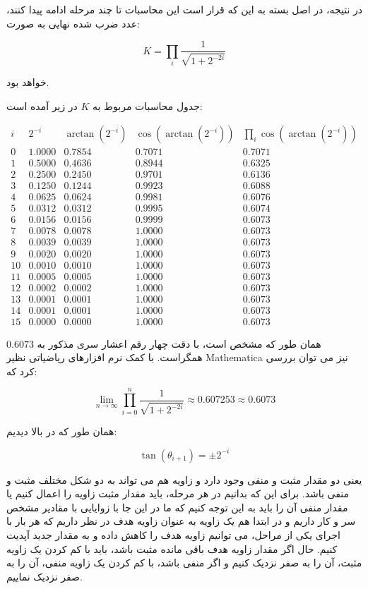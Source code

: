 \documentclass[12pt,titlepage,a4page , tikz , multi,table , svgnames,xcdraw]{article}
\begin{document}
در نتیجه، در اصل بسته به این که قرار است این محاسبات تا چند مرحله ادامه پیدا کنند، عدد ضرب شده نهایی به صورت:

$$K = \prod_{i} \frac{1}{\sqrt{1 + 2^{-2i}}}$$

خواهد بود.


جدول محاسبات مربوط به $K$ در زیر آمده است:

$$\begin{array}{c|c|c|c|c}
{i} & {2^{-i}} & {\arctan(2^{-i})} & {\cos(\arctan(2^{-i}))} & \prod_{i} \cos(\arctan(2^{-i})) \\
 0 &  1.0000 &  0.7854 &  0.7071 &  0.7071\\
  1 &  0.5000 &  0.4636 &  0.8944 &  0.6325\\
  2 &  0.2500 &  0.2450 &  0.9701 &  0.6136\\
  3 &  0.1250 &  0.1244 &  0.9923 &  0.6088\\
  4 &  0.0625 &  0.0624 &  0.9981 &  0.6076\\
  5 &  0.0312 &  0.0312 &  0.9995 &  0.6074\\
  6 &  0.0156 &  0.0156 &  0.9999 &  0.6073\\
  7 &  0.0078 &  0.0078 &  1.0000 &  0.6073\\
  8 &  0.0039 &  0.0039 &  1.0000 &  0.6073\\
  9 &  0.0020 &  0.0020 &  1.0000 &  0.6073\\
  10 &  0.0010 &  0.0010 &  1.0000 &  0.6073\\
  11 &  0.0005 &  0.0005 &  1.0000 &  0.6073\\
  12 &  0.0002 &  0.0002 &  1.0000 &  0.6073\\
  13 &  0.0001 &  0.0001 &  1.0000 &  0.6073\\
  14 &  0.0001 &  0.0001 &  1.0000 &  0.6073\\
  15 &  0.0000 &  0.0000 &  1.0000 &  0.6073

\end{array}$$

همان طور که مشخص است، با دقت چهار رقم اعشار سری مذکور به $0.6073$ همگراست. با کمک نرم افزارهای ریاضیاتی نظیر Mathematica نیز می توان بررسی کرد که:

$$\lim_{n \to \infty}  \prod_{i=0}^{n} \frac{1}{\sqrt{1 + 2^{-2i}}} \approx 0.607253 \approx 0.6073$$

همان طور که در بالا دیدیم:

$$\tan (\theta_{i+1}) = \pm 2^{-i}$$

یعنی دو مقدار مثبت و منفی وجود دارد و زاویه هم می تواند به دو شکل مختلف مثبت و منفی باشد. برای این که بدانیم در هر مرحله، باید مقدار مثبت زاویه را اعمال کنیم یا مقدار منفی آن را باید به این توجه کنیم که ما در این جا با زوایایی با مقادیر مشخص سر و کار داریم و در ابتدا هم یک زاویه به عنوان زاویه هدف در نظر داریم که هر بار با اجرای یکی از مراحل، می توانیم زاویه هدف را کاهش داده و به مقدار جدید آپدیت کنیم. حال اگر مقدار زاویه هدف باقی مانده مثبت باشد، باید با کم کردن یک زاویه مثبت، آن را به صفر نزدیک کنیم و اگر منفی باشد، با کم کردن یک زاویه منفی، آن را به صفر نزدیک نماییم.
\end{document}
